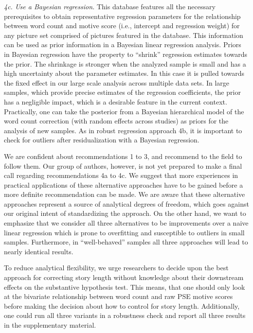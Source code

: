 \documentclass[man,a4paper,mask]{apa6}\usepackage[]{graphicx}\usepackage[]{color}
\begin{document}
\emph{4c. Use a Bayesian regression.} This database features all the necessary prerequisites to obtain representative regression parameters for the relationship between word count and motive score (i.e., intercept and regression weight) for any picture set comprised of pictures featured in the database. This information can be used as prior information in a Bayesian linear regression analysis. Priors in Bayesian regression have the property to ``shrink'' regression estimates towards the prior. The shrinkage is stronger when the analyzed sample is small and has a high uncertainty about the parameter estimates. In this case it is pulled towards the fixed effect in our large scale analysis across multiple data sets. In large samples, which provide precise estimates of the regression coefficients, the prior has a negligible impact, which is a desirable feature in the current context. 
Practically, one can take the posterior from a Bayesian hierarchical model of the word count correction (with random effects across studies) as priors for the analysis of new samples. 
As in robust regression approach 4b, it is important to check for outliers after residualization with a Bayesian regression.


We are confident about recommendations 1 to 3, and recommend to the field to follow them. Our group of authors, however, is not yet prepared to make a final call regarding recommendations 4a to 4c. We suggest that more experiences in practical applications of these alternative approaches have to be gained before a more definite recommendation can be made. We are aware that these alternative approaches represent a source of analytical degrees of freedom, which goes against our original intent of standardizing the approach. On the other hand, we want to emphasize that we consider all three alternatives to be improvements over a naive linear regression which is prone to overfitting and susceptible to outliers in small samples. Furthermore, in ``well-behaved'' samples all three approaches will lead to nearly identical results.

To reduce analytical flexibility, we urge researchers to decide upon the best approach for correcting story length without knowledge about their downstream effects on the substantive hypothesis test. This means, that one should only look at the bivariate relationship between word count and raw PSE motive scores before making the decision about how to control for story length. Additionally, one could run all three variants in a robustness check and report all three results in the supplementary material.
\end{document}

